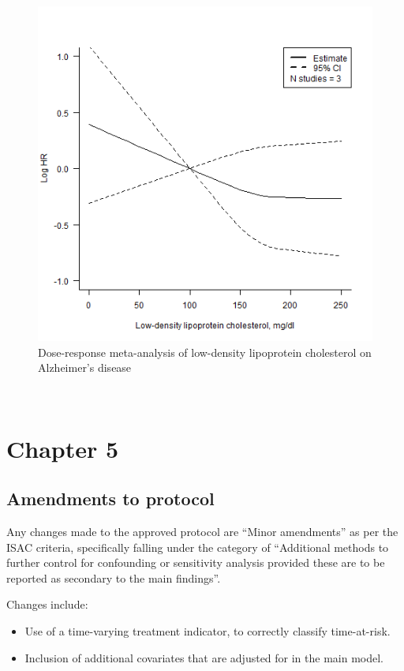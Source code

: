 \documentclass[a4paper, twoside]{templates/ociamthesis}
\providecommand{\tightlist}{%
  \setlength{\itemsep}{0pt}\setlength{\parskip}{0pt}}
\begin{document}
\begin{figure}[H]

{\centering \includegraphics[width=0.6\linewidth]{figures/sys-rev/dr_AD_LDL} 

}

\caption[Dose-response meta-analysis of low-density lipoprotein cholesterol on Alzheimer's disease]{Dose-response meta-analysis of low-density lipoprotein cholesterol on Alzheimer's disease}\label{fig:drAdLDL}
\end{figure}

~

\hypertarget{appendix-cprd-analysis}{%
\section{Chapter 5}\label{appendix-cprd-analysis}}

\hypertarget{appendix-cprd-amendments}{%
\subsection{Amendments to protocol}\label{appendix-cprd-amendments}}

Any changes made to the approved protocol are ``Minor amendments'' as per the ISAC criteria, specifically falling under the category of ``Additional methods to further control for confounding or sensitivity analysis provided these are to be reported as secondary to the main findings''.

Changes include:

\begin{itemize}
\tightlist
\item
  Use of a time-varying treatment indicator, to correctly classify time-at-risk.
\item
  Inclusion of additional covariates that are adjusted for in the main model.
\end{itemize}
\end{document}
